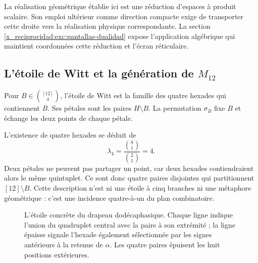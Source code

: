 La réalisation géométrique établie ici est une réduction d'espaces à produit scalaire. Son emploi ultérieur comme direction compacte exige de transporter cette droite vers la réalisation physique correspondante. La section \ref{x_reciprocidad:exc:pantallas-dualidad} expose l'application algébrique qui maintient coordonnées cette réduction et l'écran réticulaire.



\subsection{L'étoile de Witt et la génération de \texorpdfstring{$M_{12}$}{M12}}
\label{x_reciprocidad:exc:estrella}

\begin{definition}
\label{x_reciprocidad:exc:def-estrella}
Pour $B\in\binom{[12]}4$, l'étoile de Witt est la famille des
quatre hexades qui contiennent $B$. Ses pétales sont les paires $H\setminus B$.
La permutation $\sigma_B$ fixe $B$ et échange les deux points de chaque
pétale.
\end{definition}

L'existence de quatre hexades se déduit de
\[
 \lambda_4=\frac{\binom81}{\binom21}=4.
\]
Deux pétales ne peuvent pas partager un point, car deux hexades contiendraient alors le même quintuplet. Ce sont donc quatre paires disjointes qui partitionnent $[12]\setminus B$. Cette description n'est ni une étoile à cinq branches ni une métaphore géométrique : c'est une incidence quatre-à-un du plan combinatoire.

\begin{figure}[htbp]
\centering
{}
\caption{L'étoile concrète du drapeau dodécaphasique. Chaque ligne
indique l'union du quadruplet central avec la paire à son extrémité ; la
ligne épaisse signale l'hexade également sélectionnée par les signes
antérieurs à la retenue de $\alpha$. Les quatre paires épuisent les huit
positions extérieures.}
\label{x_reciprocidad:exc:fig-estrella}
\end{figure}

